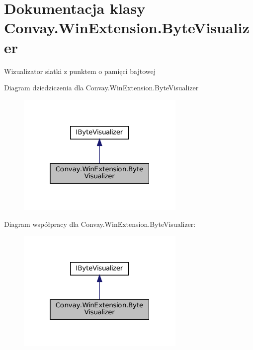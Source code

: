 \hypertarget{class_convay_1_1_win_extension_1_1_byte_visualizer}{}\section{Dokumentacja klasy Convay.\+Win\+Extension.\+Byte\+Visualizer}
\label{class_convay_1_1_win_extension_1_1_byte_visualizer}


Wizualizator siatki z punktem o pamięci bajtowej  




Diagram dziedziczenia dla Convay.\+Win\+Extension.\+Byte\+Visualizer
\nopagebreak
\begin{figure}[H]
\begin{center}
\leavevmode
\includegraphics[width=229pt]{class_convay_1_1_win_extension_1_1_byte_visualizer__inherit__graph}
\end{center}
\end{figure}


Diagram współpracy dla Convay.\+Win\+Extension.\+Byte\+Visualizer\+:
\nopagebreak
\begin{figure}[H]
\begin{center}
\leavevmode
\includegraphics[width=229pt]{class_convay_1_1_win_extension_1_1_byte_visualizer__coll__graph}
\end{center}
\end{figure}
